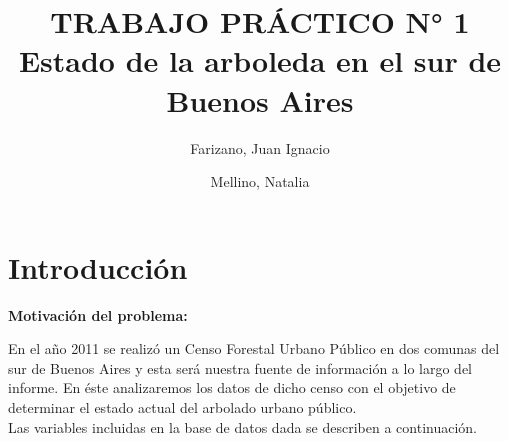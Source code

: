 \documentclass[11pt]{article}
\title{
  TRABAJO PRÁCTICO N° 1\\
  \large Estado de la arboleda en el sur de Buenos Aires
}
\author{
  Farizano, Juan Ignacio\\
  \and
  Mellino, Natalia
}
\date{}
\begin{document}
\maketitle
\newpage

\tableofcontents
\newpage


\section{Introducción}
\textbf{Motivación del problema:}

\begin{justify}
  En el año 2011 se realizó un Censo Forestal Urbano Público en dos
  comunas del sur de Buenos Aires y esta será nuestra fuente de información
  a lo largo del informe.
  En éste analizaremos los datos de dicho censo con el objetivo
  de determinar el estado actual del arbolado urbano público.\\
  Las variables incluidas en la base de datos dada se describen a continuación.
\end{justify}
\end{document}
